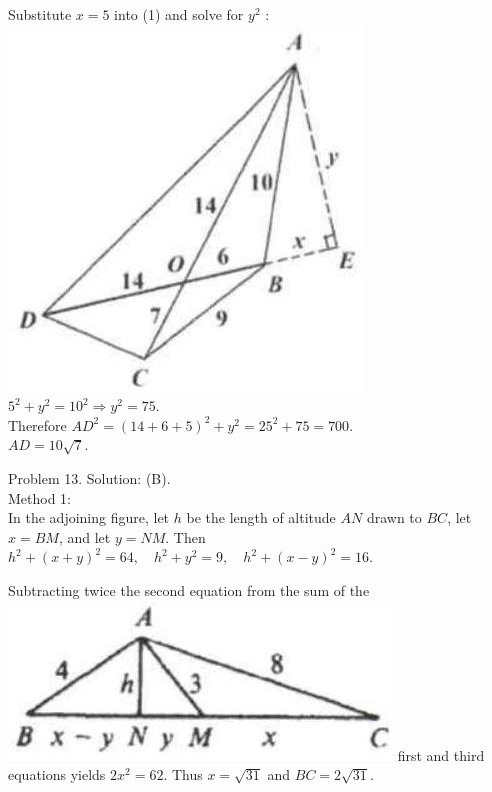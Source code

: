 \documentclass[10pt]{article}
\begin{document}
Substitute \(x=5\) into (1) and solve for \(y^{2}\) :\\
\includegraphics[max width=\textwidth, center]{2025_04_17_97bc1f7e44d93c271a88g-096(1)}\\
\(5^{2}+y^{2}=10^{2} \Rightarrow y^{2}=75\).\\
Therefore \(A D^{2}=(14+6+5)^{2}+y^{2}=25^{2}+75=700\).\\
\(A D=10 \sqrt{7}\).


Problem 13. Solution: (B).\\
Method 1:\\
In the adjoining figure, let \(h\) be the length of altitude \(A N\) drawn to \(B C\), let \(x=B M\), and let \(y=N M\). Then\\
\(h^{2}+(x+y)^{2}=64, \quad h^{2}+y^{2}=9, \quad h^{2}+(x-y)^{2}=16\).

Subtracting twice the second equation from the sum of the\\
\includegraphics[max width=\textwidth]{2025_04_17_97bc1f7e44d93c271a88g-097(1)} first and third equations yields \(2 x^{2}=62\). Thus \(x=\sqrt{31}\) and \(B C=2 \sqrt{31}\).
\end{document}
